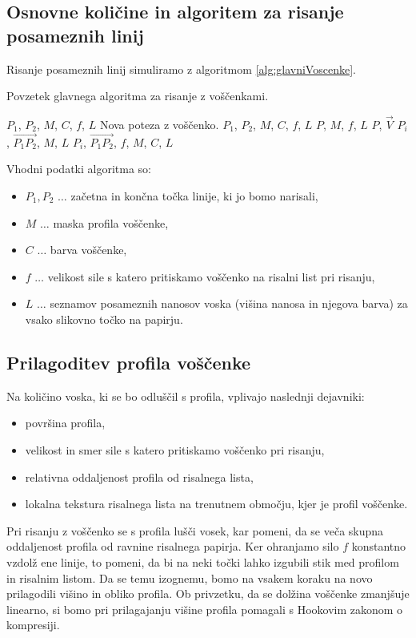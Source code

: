 \subsection{Osnovne količine in algoritem za risanje posameznih linij}
%
Risanje posameznih linij simuliramo z algoritmom \ref{alg:glavniVoscenke}.

%
\begin{algorithm}[hbt]
  \caption{Povzetek glavnega algoritma za risanje z voščenkami.}
  \label{alg:glavniVoscenke}
\begin{algorithmic}[1]
\Require $P_1$, $P_2$, $M$, $C$, $f$, $L$
\Ensure Nova poteza z voščenko.
 {$P_1$, $P_2$, $M$, $C$, $f$, $L$}
    \State {} {$P$, $M$, $f$, $L$}
    \State {} {$P$, $\vec{V}$}
    \State {} {$P_i$, $\vec{P_1P_2}$, $M$, $L$}
    \State {} {$P_i$, $\vec{P_1P_2}$, $f$, $M$, $C$, $L$}
  \EndFor
\EndFunction
\end{algorithmic}
\end{algorithm}
%

Vhodni podatki algoritma so:
%
  \begin{itemize}
  \item $P_1, P_2$ $\ldots$ začetna in končna točka linije, ki jo bomo narisali,
  \item $M$ $\ldots$ maska profila voščenke,
  \item $C$ $\ldots$ barva voščenke,
  \item $f$ $\ldots$ velikost sile s katero pritiskamo voščenko na risalni list pri risanju,
  \item $L$ $\ldots$ seznamov posameznih nanosov voska (višina nanosa in njegova barva) za vsako slikovno točko na papirju.
  \end{itemize}
%
\subsection{Prilagoditev profila voščenke}
Na količino voska, ki se bo odluščil s profila, vplivajo naslednji dejavniki:
%
  \begin{itemize}
  \item površina profila,
  \item velikost in smer sile s katero pritiskamo voščenko pri risanju,
  \item relativna oddaljenost profila od risalnega lista,
  \item lokalna tekstura risalnega lista na trenutnem območju, kjer je profil voščenke.
  \end{itemize}
%
Pri risanju z voščenko se s profila lušči vosek, kar pomeni, da se veča skupna oddaljenost profila od ravnine risalnega papirja. Ker ohranjamo silo $f$ konstantno vzdolž ene linije, to pomeni, da bi na neki točki lahko izgubili stik med profilom in risalnim listom. Da se temu izognemu, bomo na vsakem koraku na novo prilagodili višino in obliko profila. Ob privzetku, da se dolžina voščenke zmanjšuje linearno, si bomo pri prilagajanju višine profila pomagali s Hookovim zakonom o kompresiji.
%
